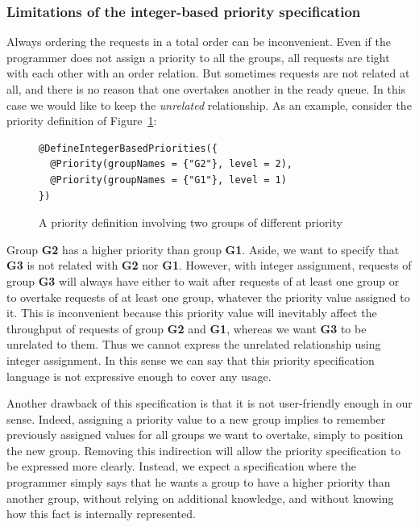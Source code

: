 \documentclass[11pt]{report}
\begin{document}
\subsubsection{Limitations of the integer-based priority specification}
Always ordering the requests in a total order can be inconvenient. Even if the programmer does not assign a priority to all the groups, all requests are tight with each other with an order relation. But sometimes requests are not related at all, and there is no reason that one overtakes another in the ready queue. In this case we would like to keep the \emph{unrelated} relationship. As an example, consider the priority definition of Figure~\ref{fig:two_priorities}:

\begin{figure}[!ht]
	\lstset{language=java, numbers=left, numberstyle=\tiny, stepnumber=1, numbersep=5pt, basicstyle=\footnotesize}
	\begin{lstlisting}[frame=single]
@DefineIntegerBasedPriorities({
  @Priority(groupNames = {"G2"}, level = 2),
  @Priority(groupNames = {"G1"}, level = 1)
})
 	\end{lstlisting}
\caption{A priority definition involving two groups of different priority}
\label{fig:two_priorities}
\end{figure}

Group \textbf{G2} has a higher priority than group \textbf{G1}. Aside, we want to specify that \textbf{G3} is not related with \textbf{G2} nor \textbf{G1}. However, with integer assignment, requests of group \textbf{G3} will always have either to wait after requests of at least one group or to overtake requests of at least one group, whatever the priority value assigned to it. This is inconvenient because this priority value will inevitably affect the throughput of requests of group \textbf{G2} and \textbf{G1}, whereas we want \textbf{G3} to be unrelated to them. Thus we cannot express the unrelated relationship using integer assignment.   
In this sense we can say that this priority specification language is not expressive enough to cover any usage. 

Another drawback of this specification is that it is not user-friendly enough in our sense. Indeed, assigning a priority value to a new group implies to remember previously assigned values for all groups we want to overtake, simply to position the new group. Removing this indirection will allow the priority specification to be expressed more clearly. Instead, we expect a specification where the programmer simply says that he wants a group to have a higher priority than another group, without relying on additional knowledge, and without knowing how this fact is internally represented.
\end{document}
